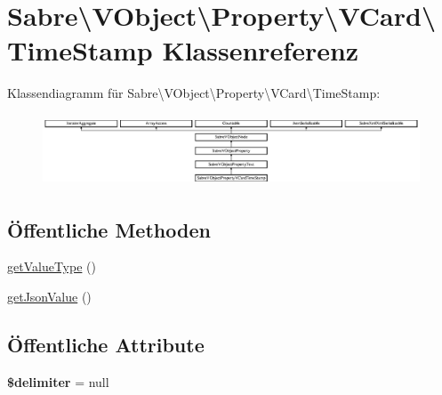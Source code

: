 \hypertarget{class_sabre_1_1_v_object_1_1_property_1_1_v_card_1_1_time_stamp}{}\section{Sabre\textbackslash{}V\+Object\textbackslash{}Property\textbackslash{}V\+Card\textbackslash{}Time\+Stamp Klassenreferenz}
\label{class_sabre_1_1_v_object_1_1_property_1_1_v_card_1_1_time_stamp}
Klassendiagramm für Sabre\textbackslash{}V\+Object\textbackslash{}Property\textbackslash{}V\+Card\textbackslash{}Time\+Stamp\+:\begin{figure}[H]
\begin{center}
\leavevmode
\includegraphics[height=2.137404cm]{class_sabre_1_1_v_object_1_1_property_1_1_v_card_1_1_time_stamp}
\end{center}
\end{figure}
\subsection*{Öffentliche Methoden}
\begin{DoxyCompactItemize}
\item 
\mbox{\hyperlink{class_sabre_1_1_v_object_1_1_property_1_1_v_card_1_1_time_stamp_ac8539217895b63c3ebe14efd4e82baa9}{get\+Value\+Type}} ()
\item 
\mbox{\hyperlink{class_sabre_1_1_v_object_1_1_property_1_1_v_card_1_1_time_stamp_a6dc1cd36f265d29ac502e7e87c056a54}{get\+Json\+Value}} ()
\end{DoxyCompactItemize}
\subsection*{Öffentliche Attribute}
\begin{DoxyCompactItemize}
\item 
\mbox{\label{class_sabre_1_1_v_object_1_1_property_1_1_v_card_1_1_time_stamp_a4e9be15f0c3b65fc5d45e799ac6a356e}} 
{\bfseries \$delimiter} = null
\end{DoxyCompactItemize}
